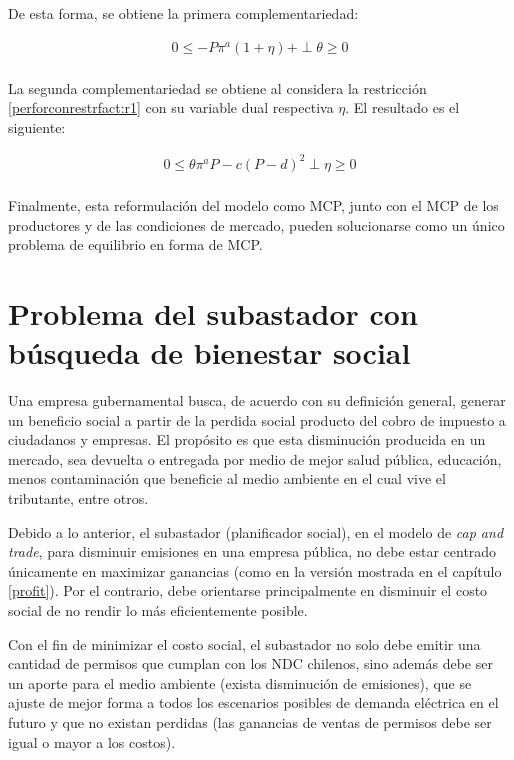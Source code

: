 De esta forma, se obtiene la primera complementariedad:

\begin{equation}
\begin{array}{rrclcl}
    0\leq -P\pi^a(1+\eta)+ \perp \theta \geq 0 \label{compllag3}\\
\end{array}
\end{equation}

La segunda complementariedad se obtiene al considera la restricción \ref{perforconrestrfact:r1} con su variable dual respectiva $\eta$. El resultado es el siguiente:

\begin{equation}
\begin{array}{rrclcl}
    0 \leq \theta \pi^a P - c(P-d)^2 \perp \eta \geq 0 \label{compllag31}\\
\end{array}
\end{equation}

Finalmente, esta reformulación del modelo como MCP, junto con el MCP de los productores y de las condiciones de mercado, pueden solucionarse como un único problema de equilibrio en forma de MCP.


\section{Problema del subastador con búsqueda de bienestar social}\label{bienestarsocial}

Una empresa gubernamental busca, de acuerdo con su definición general, generar un beneficio social a partir de la perdida social producto del cobro de impuesto a ciudadanos y empresas. El propósito es que esta disminución producida en un mercado, sea devuelta o entregada por medio de mejor salud pública, educación, menos contaminación que beneficie al medio ambiente en el cual vive el tributante, entre otros. 
\vspace{2.5mm}

Debido a lo anterior, el subastador (planificador social), en el modelo de \textit{cap and trade}, para disminuir emisiones en una empresa pública, no debe estar centrado únicamente en maximizar ganancias (como en la versión mostrada en el capítulo \ref{profit}). Por el contrario, debe orientarse principalmente en disminuir el costo social de no rendir lo más eficientemente posible.
\vspace{2.5mm}

Con el fin de minimizar el costo social, el subastador no solo debe emitir una cantidad de permisos que cumplan con los NDC chilenos, sino además debe ser un aporte para el medio ambiente (exista disminución de emisiones), que se ajuste de mejor forma a todos los escenarios posibles de demanda eléctrica en el futuro y que no existan perdidas (las ganancias de ventas de permisos debe ser igual o mayor a los costos). 
\vspace{2.5mm}

